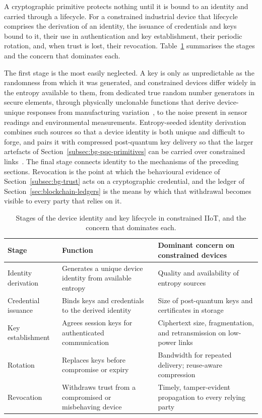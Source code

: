 A cryptographic primitive protects nothing until it is bound to an identity and
carried through a lifecycle. For a constrained industrial device that lifecycle
comprises the derivation of an identity, the issuance of credentials and keys
bound to it, their use in authentication and key establishment, their periodic
rotation, and, when trust is lost, their revocation. Table~\ref{tab:key-lifecycle}
summarises the stages and the concern that dominates each.

The first stage is the most easily neglected. A key is only as unpredictable as
the randomness from which it was generated, and constrained devices differ widely
in the entropy available to them, from dedicated true random number generators in
secure elements, through physically unclonable functions that derive
device-unique responses from manufacturing variation~\cite{hao2025efficient}, to
the noise present in sensor readings and environmental measurements.
Entropy-seeded identity derivation combines such sources so that a device
identity is both unique and difficult to forge, and pairs it with compressed
post-quantum key delivery so that the larger artefacts of
Section~\ref{subsec:bg-pqc-primitives} can be carried over constrained
links~\cite{amadi2025quantum}. The final stage connects identity to the
mechanisms of the preceding sections. Revocation is the point at which the
behavioural evidence of Section~\ref{subsec:bg-trust} acts on a cryptographic
credential, and the ledger of Section~\ref{sec:blockchain-ledgers} is the means
by which that withdrawal becomes visible to every party that relies on it.

\begin{table}[!htbp]
\centering
\footnotesize
\setlength{\tabcolsep}{4pt}
\renewcommand{\arraystretch}{1.35}
\caption{Stages of the device identity and key lifecycle in constrained IIoT, and the concern that dominates each.}
\label{tab:key-lifecycle}
\begin{tabularx}{\textwidth}{@{}
    >{\raggedright\arraybackslash}p{2.6cm}
    >{\raggedright\arraybackslash}X
    >{\raggedright\arraybackslash}X@{}}
\toprule
\textbf{Stage} & \textbf{Function} & \textbf{Dominant concern on constrained devices} \\
\midrule
Identity derivation & Generates a unique device identity from available entropy & Quality and availability of entropy sources \\
\addlinespace
Credential issuance & Binds keys and credentials to the derived identity & Size of post-quantum keys and certificates in storage \\
\addlinespace
Key establishment & Agrees session keys for authenticated communication & Ciphertext size, fragmentation, and retransmission on low-power links \\
\addlinespace
Rotation & Replaces keys before compromise or expiry & Bandwidth for repeated delivery; reuse-aware compression \\
\addlinespace
Revocation & Withdraws trust from a compromised or misbehaving device & Timely, tamper-evident propagation to every relying party \\
\bottomrule
\end{tabularx}
\end{table}

